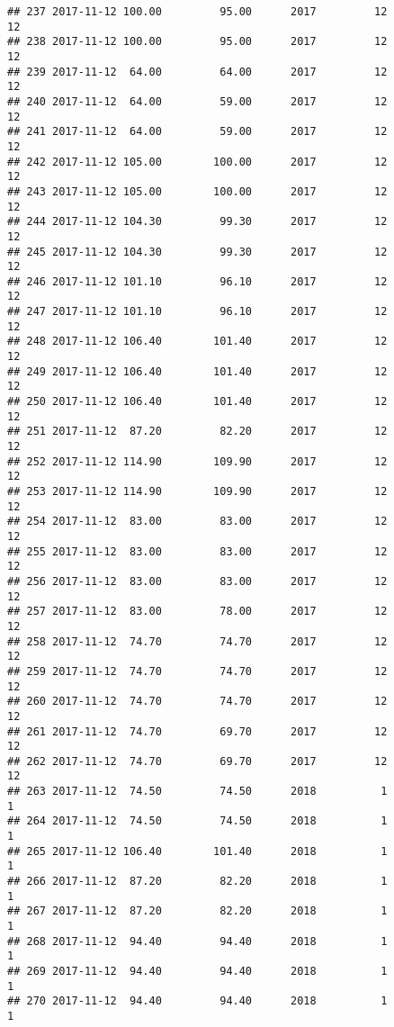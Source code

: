 \documentclass[]{article}
\begin{document}
\begin{verbatim}
## 237 2017-11-12 100.00         95.00      2017         12                12
## 238 2017-11-12 100.00         95.00      2017         12                12
## 239 2017-11-12  64.00         64.00      2017         12                12
## 240 2017-11-12  64.00         59.00      2017         12                12
## 241 2017-11-12  64.00         59.00      2017         12                12
## 242 2017-11-12 105.00        100.00      2017         12                12
## 243 2017-11-12 105.00        100.00      2017         12                12
## 244 2017-11-12 104.30         99.30      2017         12                12
## 245 2017-11-12 104.30         99.30      2017         12                12
## 246 2017-11-12 101.10         96.10      2017         12                12
## 247 2017-11-12 101.10         96.10      2017         12                12
## 248 2017-11-12 106.40        101.40      2017         12                12
## 249 2017-11-12 106.40        101.40      2017         12                12
## 250 2017-11-12 106.40        101.40      2017         12                12
## 251 2017-11-12  87.20         82.20      2017         12                12
## 252 2017-11-12 114.90        109.90      2017         12                12
## 253 2017-11-12 114.90        109.90      2017         12                12
## 254 2017-11-12  83.00         83.00      2017         12                12
## 255 2017-11-12  83.00         83.00      2017         12                12
## 256 2017-11-12  83.00         83.00      2017         12                12
## 257 2017-11-12  83.00         78.00      2017         12                12
## 258 2017-11-12  74.70         74.70      2017         12                12
## 259 2017-11-12  74.70         74.70      2017         12                12
## 260 2017-11-12  74.70         74.70      2017         12                12
## 261 2017-11-12  74.70         69.70      2017         12                12
## 262 2017-11-12  74.70         69.70      2017         12                12
## 263 2017-11-12  74.50         74.50      2018          1                 1
## 264 2017-11-12  74.50         74.50      2018          1                 1
## 265 2017-11-12 106.40        101.40      2018          1                 1
## 266 2017-11-12  87.20         82.20      2018          1                 1
## 267 2017-11-12  87.20         82.20      2018          1                 1
## 268 2017-11-12  94.40         94.40      2018          1                 1
## 269 2017-11-12  94.40         94.40      2018          1                 1
## 270 2017-11-12  94.40         94.40      2018          1                 1

\end{verbatim}
\end{document}
